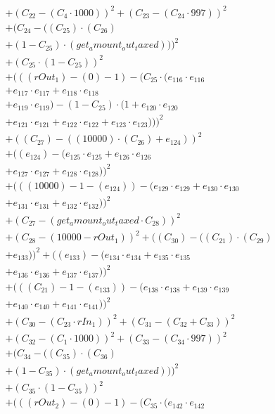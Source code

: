 \documentclass[10pt, a4paper]{article}
\begin{document}
\begin{small}
\begin{align*}
& + (C_{22} - (C_{4}  \cdot  1000))^{2} + (C_{23} - (C_{24}  \cdot  997))^{2} \\
& + (C_{24} - ((C_{25})  \cdot  (C_{26}) \\
& + (1 - C_{25})  \cdot  (get_amount_out_taxed)))^{2} \\
& + (C_{25} \cdot (1 - C_{25}))^{2} \\
& + (((rOut_1) - (0) - 1) - (C_{25} \cdot (e_{116} \cdot e_{116} \\
& + e_{117} \cdot e_{117} + e_{118} \cdot e_{118} \\
& + e_{119} \cdot e_{119}) - (1 - C_{25}) \cdot (1 + e_{120} \cdot e_{120} \\
& + e_{121} \cdot e_{121} + e_{122} \cdot e_{122} + e_{123} \cdot e_{123})))^{2} \\
& + ((C_{27}) - ((10000)  \cdot  (C_{26}) + e_{124}))^{2} \\
& + ((e_{124}) - (e_{125} \cdot e_{125} + e_{126} \cdot e_{126} \\
& + e_{127} \cdot e_{127} + e_{128} \cdot e_{128}))^{2} \\
& + (((10000) - 1 - (e_{124})) - (e_{129} \cdot e_{129} + e_{130} \cdot e_{130} \\
& + e_{131} \cdot e_{131} + e_{132} \cdot e_{132}))^{2} \\
& + (C_{27} - (get_amount_out_taxed  \cdot  C_{28}))^{2} \\
& + (C_{28} - (10000 - rOut_1))^{2} + ((C_{30}) - ((C_{21})  \cdot  (C_{29}) \\
& + e_{133}))^{2} + ((e_{133}) - (e_{134} \cdot e_{134} + e_{135} \cdot e_{135} \\
& + e_{136} \cdot e_{136} + e_{137} \cdot e_{137}))^{2} \\
& + (((C_{21}) - 1 - (e_{133})) - (e_{138} \cdot e_{138} + e_{139} \cdot e_{139} \\
& + e_{140} \cdot e_{140} + e_{141} \cdot e_{141}))^{2} \\
& + (C_{30} - (C_{23}  \cdot  rIn_1))^{2} + (C_{31} - (C_{32} + C_{33}))^{2} \\
& + (C_{32} - (C_{1}  \cdot  1000))^{2} + (C_{33} - (C_{34}  \cdot  997))^{2} \\
& + (C_{34} - ((C_{35})  \cdot  (C_{36}) \\
& + (1 - C_{35})  \cdot  (get_amount_out_taxed)))^{2} \\
& + (C_{35} \cdot (1 - C_{35}))^{2} \\
& + (((rOut_2) - (0) - 1) - (C_{35} \cdot (e_{142} \cdot e_{142} \\

\end{align*}
\end{small}
\end{document}
